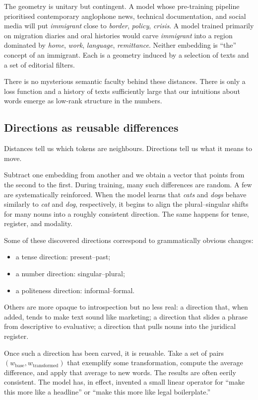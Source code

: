 \documentclass[12pt,a4paper]{book}
\begin{document}
The geometry is unitary but contingent. A model whose pre-training pipeline prioritised contemporary anglophone news, technical documentation, and social media will put \emph{immigrant} close to \emph{border}, \emph{policy}, \emph{crisis}. A model trained primarily on migration diaries and oral histories would carve \emph{immigrant} into a region dominated by \emph{home}, \emph{work}, \emph{language}, \emph{remittance}. Neither embedding is ``the'' concept of an immigrant. Each is a geometry induced by a selection of texts and a set of editorial filters.

There is no mysterious semantic faculty behind these distances. There is only a loss function and a history of texts sufficiently large that our intuitions about words emerge as low-rank structure in the numbers.

\subsection*{Directions as reusable differences}

Distances tell us which tokens are neighbours. Directions tell us what it means to move.

Subtract one embedding from another and we obtain a vector that points from the second to the first. During training, many such differences are random. A few are systematically reinforced. When the model learns that \emph{cats} and \emph{dogs} behave similarly to \emph{cat} and \emph{dog}, respectively, it begins to align the plural--singular shifts for many nouns into a roughly consistent direction. The same happens for tense, register, and modality.

Some of these discovered directions correspond to grammatically obvious changes:

\begin{itemize}
  \item a tense direction: present--past;
  \item a number direction: singular--plural;
  \item a politeness direction: informal--formal.
\end{itemize}

Others are more opaque to introspection but no less real: a direction that, when added, tends to make text sound like marketing; a direction that slides a phrase from descriptive to evaluative; a direction that pulls nouns into the juridical register.

Once such a direction has been carved, it is reusable. Take a set of pairs $(w_{\mathrm{base}}, w_{\mathrm{transformed}})$ that exemplify some transformation, compute the average difference, and apply that average to new words. The results are often eerily consistent. The model has, in effect, invented a small linear operator for ``make this more like a headline'' or ``make this more like legal boilerplate.''
\end{document}
